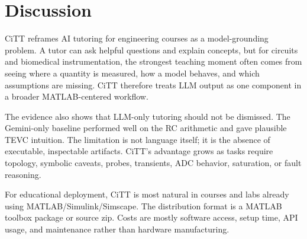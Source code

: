\section{Discussion}

CiTT reframes AI tutoring for engineering courses as a model-grounding problem. A tutor can ask helpful questions and explain concepts, but for circuits and biomedical instrumentation, the strongest teaching moment often comes from seeing where a quantity is measured, how a model behaves, and which assumptions are missing. CiTT therefore treats LLM output as one component in a broader MATLAB-centered workflow.

The evidence also shows that LLM-only tutoring should not be dismissed. The Gemini-only baseline performed well on the RC arithmetic and gave plausible TEVC intuition. The limitation is not language itself; it is the absence of executable, inspectable artifacts. CiTT's advantage grows as tasks require topology, symbolic caveats, probes, transients, ADC behavior, saturation, or fault reasoning.

For educational deployment, CiTT is most natural in courses and labs already using MATLAB/Simulink/Simscape. The distribution format is a MATLAB toolbox package or source zip. Costs are mostly software access, setup time, API usage, and maintenance rather than hardware manufacturing.


